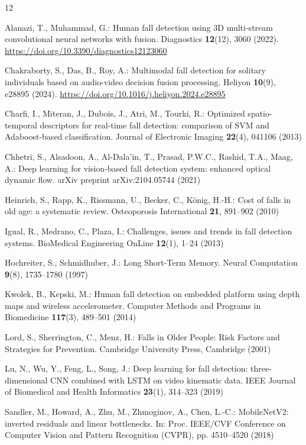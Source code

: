 \documentclass[runningheads]{llncs}
\providecommand{\doi}[1]{\url{https://doi.org/#1}}
\begin{document}
\begin{thebibliography}{12}

Alanazi, T., Muhammad, G.: Human fall detection using 3D multi-stream convolutional neural networks with fusion. Diagnostics \textbf{12}(12), 3060 (2022). \doi{10.3390/diagnostics12123060}

Chakraborty, S., Das, B., Roy, A.: Multimodal fall detection for solitary individuals based on audio-video decision fusion processing. Heliyon \textbf{10}(9), e28895 (2024). \doi{10.1016/j.heliyon.2024.e28895}

Charfi, I., Miteran, J., Dubois, J., Atri, M., Tourki, R.: Optimized spatio-temporal descriptors for real-time fall detection: comparison of SVM and Adaboost-based classification. Journal of Electronic Imaging \textbf{22}(4), 041106 (2013)

Chhetri, S., Alsadoon, A., Al-Dala'in, T., Prasad, P.W.C., Rashid, T.A., Maag, A.: Deep learning for vision-based fall detection system: enhanced optical dynamic flow. arXiv preprint arXiv:2104.05744 (2021)

Heinrich, S., Rapp, K., Rissmann, U., Becker, C., K\"{o}nig, H.-H.: Cost of falls in old age: a systematic review. Osteoporosis International \textbf{21}, 891--902 (2010)

Igual, R., Medrano, C., Plaza, I.: Challenges, issues and trends in fall detection systems. BioMedical Engineering OnLine \textbf{12}(1), 1--24 (2013)

Hochreiter, S., Schmidhuber, J.: Long Short-Term Memory. Neural Computation \textbf{9}(8), 1735--1780 (1997)

Kwolek, B., Kepski, M.: Human fall detection on embedded platform using depth maps and wireless accelerometer. Computer Methods and Programs in Biomedicine \textbf{117}(3), 489--501 (2014)

Lord, S., Sherrington, C., Menz, H.: Falls in Older People: Risk Factors and Strategies for Prevention. Cambridge University Press, Cambridge (2001)

Lu, N., Wu, Y., Feng, L., Song, J.: Deep learning for fall detection: three-dimensional CNN combined with LSTM on video kinematic data. IEEE Journal of Biomedical and Health Informatics \textbf{23}(1), 314--323 (2019)

Sandler, M., Howard, A., Zhu, M., Zhmoginov, A., Chen, L.-C.: MobileNetV2: inverted residuals and linear bottlenecks. In: Proc. IEEE/CVF Conference on Computer Vision and Pattern Recognition (CVPR), pp. 4510--4520 (2018)


\end{thebibliography}
\end{document}
